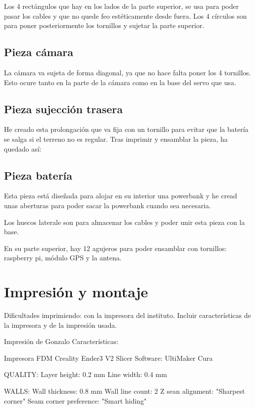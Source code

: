 Los 4 rectángulos que hay en los lados de la parte superior, se usa para poder pasar los cables y que no quede feo estéticamente desde fuera. Los 4 círculos son para poner posteriormente los tornillos y sujetar la parte superior.

\subsection{Pieza cámara}
La cámara va sujeta de forma diagonal, ya que no hace falta poner los 4 tornillos. Esto ocure tanto en la parte de la cámara como en la base del servo que usa.


\subsection{Pieza sujección trasera}
He creado esta prolongación que va fija con un tornillo para evitar que la batería se salga si el terreno no es regular. Tras imprimir y ensamblar la pieza, ha quedado así:

\subsection{Pieza batería}

Esta pieza está diseñada para alojar en su interior una powerbank y he cread unas aberturas para poder sacar la powerbank cuando sea necesaria.

Los huecos laterale son para almacenar los cables y poder unir esta pieza con la base.

En su parte superior, hay 12 agujeros para poder ensamblar con tornillos: raspberry pi, módulo GPS y la antena.



\section{Impresión y montaje}


Dificultades imprimiendo: con la impresora del instituto. Incluir características de la impresora y de la impresión usada.

Impresión de Gonzalo
Características: 

Impresora FDM Creality Ender3 V2
Slicer Software: UltiMaker Cura

QUALITY:
Layer height: 0.2 mm
Line width: 0.4 mm

WALLS: 
Wall thickness: 0.8 mm
Wall line count: 2
Z sean alignment: "Sharpest corner"
Seam corner preference: "Smart hiding"

